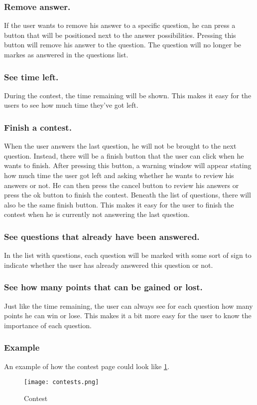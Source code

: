 \subsubsection{Remove answer.} 
If the user wants to remove his answer to a specific question, he can press a button that will be positioned next to the answer possibilities. Pressing this button will remove his answer to the question. The question will no longer be markes as answered in the questions list.

\subsubsection{See time left.} 
During the contest, the time remaining will be shown. This makes it easy for the users to see how much time they've got left. 

\subsubsection{Finish a contest.} 
When the user answers the last question, he will not be brought to the next question. Instead, there will be a finish button that the user can click when he wants to finish. After pressing this button, a warning window will appear stating how much time the user got left and asking whether he wants to review his answers or not. He can then press the cancel button to review his answers or press the ok button to finish the contest. Beneath the list of questions, there will also be the same finish button. This makes it easy for the user to finish the contest when he is currently not answering the last question. 

\subsubsection{See questions that already have been answered.} 
In the list with questions, each question will be marked with some sort of sign to indicate whether the user has already answered this question or not. 

\subsubsection{See how many points that can be gained or lost.}
Just like the time remaining, the user can always see for each question how many points he can win or lose. This makes it a bit more easy for the user to know the importance of each question. 

\subsubsection{Example}
An example of how the contest page could look like \ref{Contest}.
		\begin{figure}[h]
		  \centering
			\texttt{[image: contests.png]}
		  \caption{Contest}
		  \label{Contest}
		\end{figure}

